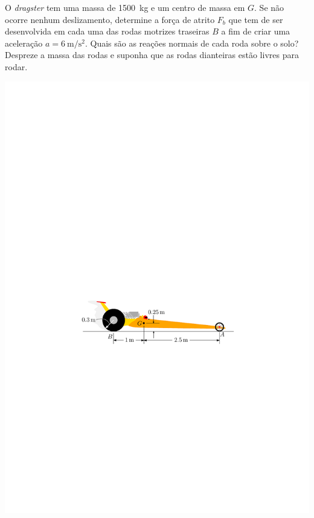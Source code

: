\item O \textit{dragster} tem uma massa de \SI{1500}{\kilogram} e um centro de massa em $G$. Se não ocorre nenhum deslizamento, determine a força de atrito $F_{b}$ que tem de ser desenvolvida em cada uma das rodas motrizes traseiras $B$ a fim de criar uma aceleração $a=\SI{6}{\meter/\second^{2}}$. Quais são as reações normais de cada roda sobre o solo? Despreze a massa das rodas e suponha que as rodas dianteiras estão livres para rodar.

\begin{flushleft}
	\includegraphics[scale=1]{../../images/draw_5}
\end{flushleft}